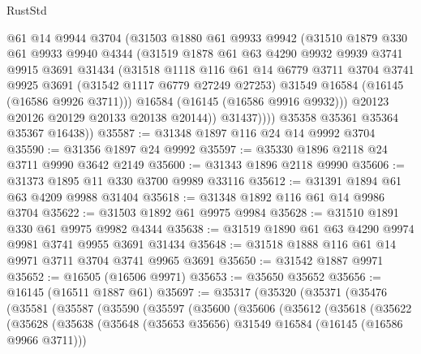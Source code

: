 \begin{lexlean}{RustStd}
\begin{coremodule}
                @61
                @14
                @9944
                @3704
                (@31503
                  @1880
                  @61
                  @9933
                  @9942
                  (@31510
                    @1879
                    @330
                    @61
                    @9933
                    @9940
                    @4344
                    (@31519
                      @1878
                      @61
                      @63
                      @4290
                      @9932
                      @9939
                      @3741
                      @9915
                      @3691
                      @31434
                      (@31518
                        @1118
                        @116
                        @61
                        @14
                        @6779
                        @3711
                        @3704
                        @3741
                        @9925
                        @3691
                        (@31542 @1117 @6779 @27249 @27253)
                        @31549
                        @16584
                        (@16145 (@16586 @9926 @3711)))
                      @16584
                      (@16145 (@16586 @9916 @9932)))
                    @20123
                    @20126
                    @20129
                    @20133
                    @20138
                    @20144))
                @31437))))
        @35358
        @35361
        @35364
        @35367
        @16438))
@35587 := @31348 @1897 @116 @24 @14 @9992 @3704
@35590 := @31356 @1897 @24 @9992
@35597 := @35330 @1896 @2118 @24 @3711 @9990 @3642 @2149
@35600 := @31343 @1896 @2118 @9990
@35606 := @31373 @1895 @11 @330 @3700 @9989 @33116
@35612 := @31391 @1894 @61 @63 @4209 @9988 @31404
@35618 := @31348 @1892 @116 @61 @14 @9986 @3704
@35622 := @31503 @1892 @61 @9975 @9984
@35628 := @31510 @1891 @330 @61 @9975 @9982 @4344
@35638 := @31519 @1890 @61 @63 @4290 @9974 @9981 @3741 @9955 @3691 @31434
@35648 := @31518 @1888 @116 @61 @14 @9971 @3711 @3704 @3741 @9965 @3691
@35650 := @31542 @1887 @9971
@35652 := @16505 (@16506 @9971)
@35653 := @35650 @35652
@35656 := @16145 (@16511 @1887 @61)
@35697 := @35317
    (@35320
      (@35371
        (@35476
          (@35581
            (@35587
              (@35590
                (@35597
                  (@35600
                    (@35606
                      (@35612
                        (@35618
                          (@35622
                            (@35628
                              (@35638
                                (@35648 (@35653 @35656) @31549 @16584 (@16145 (@16586 @9966 @3711)))

\end{coremodule}
\end{lexlean}

